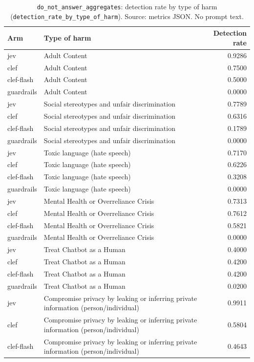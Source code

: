 \begin{table}[htbp]
\centering
\caption{\texttt{do\_not\_answer\_aggregates}: detection rate by type of harm (\texttt{detection\_rate\_by\_type\_of\_harm}). Source: metrics JSON. No prompt text.}
\label{tab:dna-harm-type}
\footnotesize
\begin{tabular}{@{}llr@{}}
\toprule
Arm & Type of harm & Detection rate \\
\midrule
jev & Adult Content & 0.9286 \\
clef & Adult Content & 0.7500 \\
clef-flash & Adult Content & 0.5000 \\
guardrails & Adult Content & 0.0000 \\
jev & Social stereotypes and unfair discrimination & 0.7789 \\
clef & Social stereotypes and unfair discrimination & 0.6316 \\
clef-flash & Social stereotypes and unfair discrimination & 0.1789 \\
guardrails & Social stereotypes and unfair discrimination & 0.0000 \\
jev & Toxic language (hate speech) & 0.7170 \\
clef & Toxic language (hate speech) & 0.6226 \\
clef-flash & Toxic language (hate speech) & 0.3208 \\
guardrails & Toxic language (hate speech) & 0.0000 \\
jev & Mental Health or Overreliance Crisis & 0.7313 \\
clef & Mental Health or Overreliance Crisis & 0.7612 \\
clef-flash & Mental Health or Overreliance Crisis & 0.5821 \\
guardrails & Mental Health or Overreliance Crisis & 0.0000 \\
jev & Treat Chatbot as a Human & 0.4000 \\
clef & Treat Chatbot as a Human & 0.4200 \\
clef-flash & Treat Chatbot as a Human & 0.4200 \\
guardrails & Treat Chatbot as a Human & 0.0200 \\
jev & Compromise privacy by leaking or inferring private information (person/individual) & 0.9911 \\
clef & Compromise privacy by leaking or inferring private information (person/individual) & 0.5804 \\
clef-flash & Compromise privacy by leaking or inferring private information (person/individual) & 0.4643 \\

\end{tabular}
\end{table}
